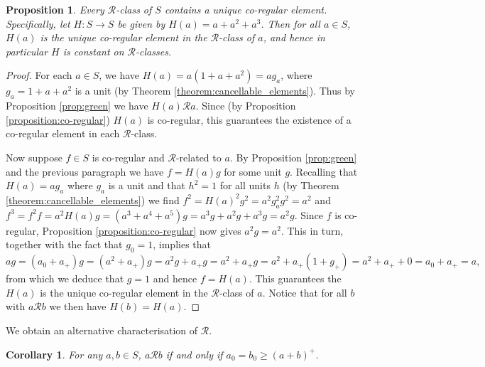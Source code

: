 \documentclass[a4paper, 11pt]{article}
\theoremstyle{plain}
\newtheorem{corollary}  [theorem]{Corollary}
\newtheorem{proposition}[theorem]{Proposition}
\theoremstyle{definition}
\begin{document}
\begin{proposition} \label{proposition:co-regular_R-class}
Every $\mathcal{R}$-class of $S$ contains a unique co-regular element. Specifically, let $H: S \rightarrow S$ be given by $H(a) = a + a^2 + a^3$. Then for all $a \in S$, $H(a)$ is the unique co-regular element in the $\mathcal{R}$-class of $a$, and hence in particular $H$ is constant on $\mathcal{R}$-classes.
\end{proposition}

\begin{proof}
For each $a \in S$, we have $H(a) = a(1 + a + a^2) = a g_a$, where $g_a = 1 + a + a^2$ is a unit (by Theorem \ref{theorem:cancellable_elements}). Thus by Proposition \ref{prop:green} we have $H(a) \mathcal{R} a$. Since (by Proposition \ref{proposition:co-regular}) $H(a)$ is co-regular, this guarantees the existence of a co-regular element in each $\mathcal{R}$-class.

Now suppose $f \in S$ is co-regular and $\mathcal{R}$-related to $a$. By Proposition \ref{prop:green} and the previous paragraph we have $f = H(a) g$ for some unit $g$. Recalling that $H(a) = ag_a$ where $g_a$ is a unit and that $h^2=1$ for all units $h$ (by Theorem \ref{theorem:cancellable_elements}) we find $f^2 = H(a)^2g^2 = a^2g_a^2g^2 = a^2$  and $f^3 = f^2f = a^2H(a)g = (a^3+a^4+a^5)g = a^3g + a^2g + a^3g = a^2g$. Since $f$ is co-regular, Proposition \ref{proposition:co-regular} now gives $a^2g= a^2$. This in turn, together with the fact that $g_0=1$, implies that 
$$ag = (a_0 + a_+)g = (a^2+a_+)g = a^2g + a_+g = a^2 + a_+g = a^2 + a_+(1+g_+)  = a^2 + a_+ +0= a_0 + a_+= a,$$ from which we deduce that $g=1$ and hence $f = H(a)$. This guarantees the $H(a)$ is the unique co-regular element in the $\mathcal{R}$-class of $a$. Notice that for all $b$ with $a\mathcal{R} b$ we then have $H(b) = H(a)$.
\end{proof}

We obtain an alternative characterisation of $\mathcal{R}$.

\begin{corollary} \label{corollary:R}  
For any $a, b \in S$, $a \mathcal{R} b$ if and only if $a_0 = b_0 \ge (a+b)^+$.
\end{corollary}
\end{document}
